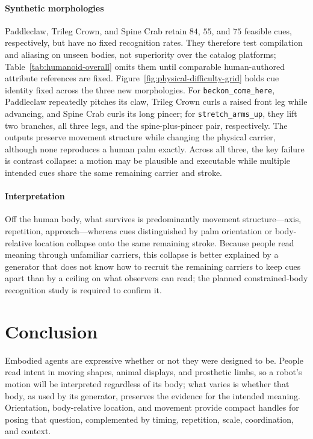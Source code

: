 \documentclass[letterpaper,10pt,conference]{ieeeconf}
\begin{document}
\paragraph{Synthetic morphologies}
Paddleclaw, Trileg Crown, and Spine Crab retain $84$, $55$, and $75$ feasible cues, respectively, but have no fixed recognition rates.
They therefore test compilation and aliasing on unseen bodies, not superiority over the catalog platforms; Table~\ref{tab:humanoid-overall} omits them until comparable human-authored attribute references are fixed.
Figure~\ref{fig:physical-difficulty-grid} holds cue identity fixed across the three new morphologies.
For \texttt{beckon\_come\_here}, Paddleclaw repeatedly pitches its claw, Trileg Crown curls a raised front leg while advancing, and Spine Crab curls its long pincer; for \texttt{stretch\_arms\_up}, they lift two branches, all three legs, and the spine-plus-pincer pair, respectively.
The outputs preserve movement structure while changing the physical carrier, although none reproduces a human palm exactly.
Across all three, the key failure is contrast collapse: a motion may be plausible and executable while multiple intended cues share the same remaining carrier and stroke.

\paragraph{Interpretation}
Off the human body, what survives is predominantly movement structure---axis, repetition, approach---whereas cues distinguished by palm orientation or body-relative location collapse onto the same remaining stroke. Because people read meaning through unfamiliar carriers, this collapse is better explained by a generator that does not know how to recruit the remaining carriers to keep cues apart than by a ceiling on what observers can read; the planned constrained-body recognition study is required to confirm it.

\section{Conclusion}
Embodied agents are expressive whether or not they were designed to be.
People read intent in moving shapes, animal displays, and prosthetic limbs, so a robot's motion will be interpreted regardless of its body; what varies is whether that body, as used by its generator, preserves the evidence for the intended meaning.
Orientation, body-relative location, and movement provide compact handles for posing that question, complemented by timing, repetition, scale, coordination, and context.
\end{document}
